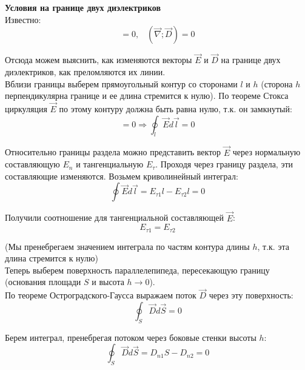\documentclass{article}
\begin{document}
	
	\textbf{Условия на границе двух диэлектриков}\\

	Известно:
	\begin{equation}
		[\vec\nabla;\vec E] = 0,\;\;\;(\vec\nabla;\vec D) = 0
	\end{equation}

	Отсюда можем выяснить, как изменяются векторы $\vec E$ и $\vec D$ на границе двух диэлектриков, как преломляются их линии.\\

	Вблизи границы выберем прямоугольный контур со сторонами $l$ и $h$ (сторона $h$ перпендикулярна границе и ее длина стремится к нулю). По теореме Стокса циркуляция $\vec E$ по этому контуру должна быть равна нулю, т.к. он замкнутый:
	\begin{equation}
		[\vec\nabla;\vec E]=0 \Rightarrow \oint_l \vec E d\vec l = 0
	\end{equation}

	Относительно границы раздела можно представить вектор $\vec E$ через нормальную составляющую $E_n$ и тангенциальную $E_\tau$. Проходя через границу раздела, эти составляющие изменяются. Возьмем криволинейный интеграл:
	\begin{equation}
		\oint \vec E d\vec l = E_{\tau1}l- E_{\tau2}l = 0
	\end{equation}

	Получили соотношение для тангенциальной составляющей $\vec E$:
	\begin{equation}
		E_{\tau1} = E_{\tau2}
	\end{equation}

	(Мы пренебрегаем значением интеграла по частям контура длины $h$, т.к. эта длина стремится к нулю)\\

	Теперь выберем поверхность параллелепипеда, пересекающую границу (основания площади $S$ и высота $h\rightarrow 0$).\\

	По теореме Остроградского-Гаусса выражаем поток $\vec D$ через эту поверхность:
	\begin{equation}
		\oint_S \vec D d\vec S = 0
	\end{equation}

	Берем интеграл, пренебрегая потоком через боковые стенки высоты $h$:
	\begin{equation}
		\oint_S \vec D d\vec S = D_{n1}S - D_{n2} = 0
	\end{equation}
\end{document}
